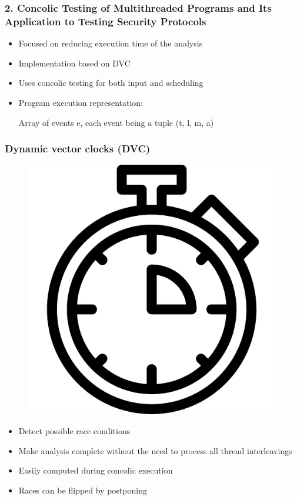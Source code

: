 \documentclass{beamer}
\begin{document}
	\begin{frame}
		\frametitle{2. Concolic Testing of Multithreaded Programs and	Its Application to Testing Security Protocols \cite{base4}}
		
		\begin{itemize}
			\item Focused on reducing execution time of the analysis
			\item Implementation based on DVC
			\item Uses concolic testing for both input and scheduling
			\item Program execution representation:
			
			Array of events e, each event being a tuple (t, l, m, a)
		\end{itemize}
	\end{frame}
	
	\begin{frame}
		\frametitle{Dynamic vector clocks (DVC) \cite{dvcproof}}
		
		\begin{figure}[htbp]
			\centering
			\includegraphics[scale=0.1]{clock}
		\end{figure}
		
		\begin{itemize}
			\item Detect possible race conditions
			\item Make analysis complete without the need to process all thread interleavings
			\item Easily computed during concolic execution
			\item Races can be flipped by postponing
		\end{itemize}
	\end{frame}
\end{document}
